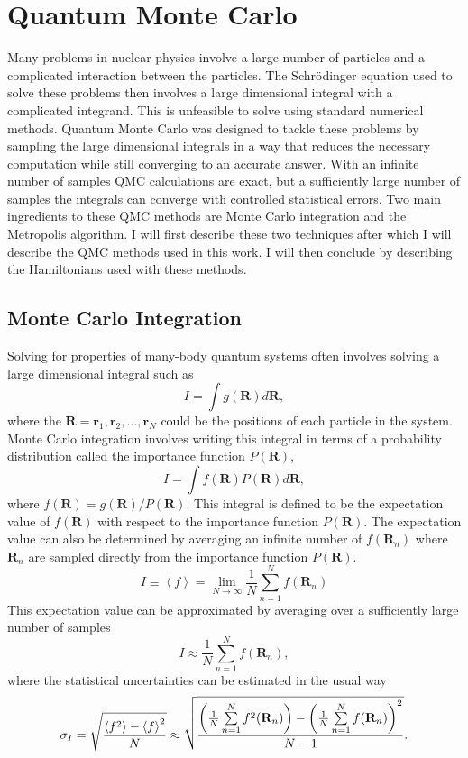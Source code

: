 \section{Quantum Monte Carlo}
Many problems in nuclear physics involve a large number of particles and a complicated interaction between the particles. The Schr\"odinger equation used to solve these problems then involves a large dimensional integral with a complicated integrand. This is unfeasible to solve using standard numerical methods. Quantum Monte Carlo was designed to tackle these problems by sampling the large dimensional integrals in a way that reduces the necessary computation while still converging to an accurate answer. With an infinite number of samples QMC calculations are exact, but a sufficiently large number of samples the integrals can converge with controlled statistical errors. Two main ingredients to these QMC methods are Monte Carlo integration and the Metropolis algorithm. I will first describe these two techniques after which I will describe the QMC methods used in this work. I will then conclude by describing the Hamiltonians used with these methods.

\subsection{Monte Carlo Integration}
Solving for properties of many-body quantum systems often involves solving a large dimensional integral such as
\begin{equation}
   I=\int g(\mathbf{R}) d\mathbf{R},
\end{equation}
where the $\mathbf{R}=\mathbf{r}_1,\mathbf{r}_2,\ldots,\mathbf{r}_N$ could be the positions of each particle in the system. Monte Carlo integration involves writing this integral in terms of a probability distribution called the importance function $P(\mathbf{R})$,
\begin{equation}
   I=\int f(\mathbf{R}) P(\mathbf{R}) d\mathbf{R},
\end{equation}
where $f(\mathbf{R}) = g(\mathbf{R})/P(\mathbf{R})$. This integral is defined to be the expectation value of $f(\mathbf{R})$ with respect to the importance function $P(\mathbf{R})$. The expectation value can also be determined by averaging an infinite number of $f(\mathbf{R}_n)$ where $\mathbf{R}_n$ are sampled directly from the importance function $P(\mathbf{R})$.
\begin{equation}
   I \equiv \left<f\right> = \lim\limits_{N\rightarrow\infty} \frac{1}{N} \sum\limits_{n=1}^N f(\mathbf{R}_n)
   \label{equ:mci}
\end{equation}
This expectation value can be approximated by averaging over a sufficiently large number of samples
\begin{equation}
   I \approx \frac{1}{N} \sum\limits_{n=1}^N f(\mathbf{R}_n),
\end{equation}
where the statistical uncertainties can be estimated in the usual way
\begin{equation}
   \sigma_{I} = \sqrt{\frac{\left< f^2 \right>-\left< f \right>^2}{N}} \approx \sqrt{\frac{\left(\frac{1}{N}\sum\limits_{n=1}^Nf^2(\mathbf{R}_n)\right) - \left(\frac{1}{N}\sum\limits_{n=1}^Nf(\mathbf{R}_n)\right)^2}{N-1}}.
\end{equation}

